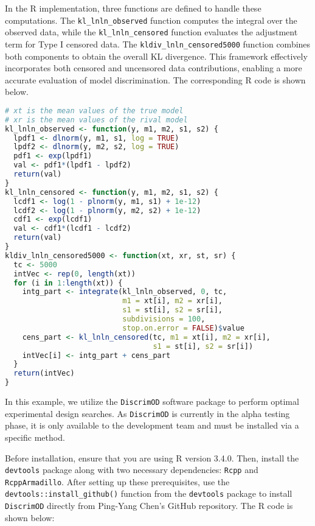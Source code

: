 \hspace*{8mm} In the R implementation, three functions are defined to handle these computations. The \verb|kl_lnln_observed| function computes the integral over the observed data, while the \verb|kl_lnln_censored| function evaluates the adjustment term for Type I censored data. The \verb|kldiv_lnln_censored5000| function combines both components to obtain the overall KL divergence. This framework effectively incorporates both censored and uncensored data contributions, enabling a more accurate evaluation of model discrimination. The corresponding R code is shown below.

\begin{lstlisting}[language=R, caption={Defining the KL Divergence Function}]
# xt is the mean values of the true model
# xr is the mean values of the rival model
kl_lnln_observed <- function(y, m1, m2, s1, s2) {
  lpdf1 <- dlnorm(y, m1, s1, log = TRUE)
  lpdf2 <- dlnorm(y, m2, s2, log = TRUE)
  pdf1 <- exp(lpdf1)
  val <- pdf1*(lpdf1 - lpdf2)
  return(val)
}
kl_lnln_censored <- function(y, m1, m2, s1, s2) {
  lcdf1 <- log(1 - plnorm(y, m1, s1) + 1e-12)
  lcdf2 <- log(1 - plnorm(y, m2, s2) + 1e-12)
  cdf1 <- exp(lcdf1)
  val <- cdf1*(lcdf1 - lcdf2)
  return(val)
}
kldiv_lnln_censored5000 <- function(xt, xr, st, sr) {
  tc <- 5000
  intVec <- rep(0, length(xt))
  for (i in 1:length(xt)) {
    intg_part <- integrate(kl_lnln_observed, 0, tc,
                           m1 = xt[i], m2 = xr[i], 
                           s1 = st[i], s2 = sr[i],
                           subdivisions = 100,
                           stop.on.error = FALSE)$value
    cens_part <- kl_lnln_censored(tc, m1 = xt[i], m2 = xr[i],
                                  s1 = st[i], s2 = sr[i])
    intVec[i] <- intg_part + cens_part
  }
  return(intVec)
}
\end{lstlisting}

\hspace*{8mm} In this example, we utilize the \verb|DiscrimOD| software package to perform optimal experimental design searches. As \verb|DiscrimOD| is currently in the alpha testing phase, it is only available to the development team and must be installed via a specific method.

\hspace*{8mm} Before installation, ensure that you are using R version 3.4.0. Then, install the \verb|devtools| package along with two necessary dependencies: \verb|Rcpp| and \verb|RcppArmadillo|. After setting up these prerequisites, use the \verb|devtools::install_github()| function from the \verb|devtools| package to install \verb|DiscrimOD| directly from Ping-Yang Chen's GitHub repository. The R code is shown below:

